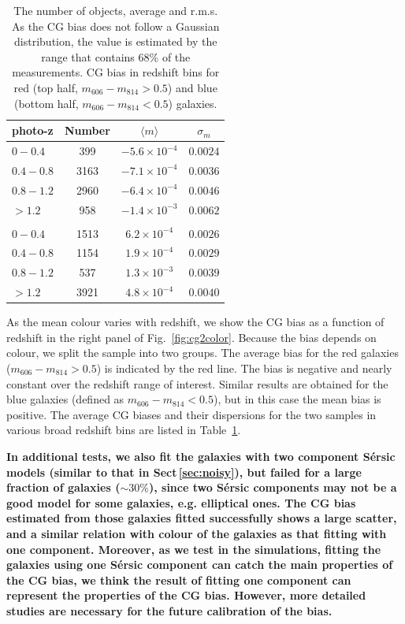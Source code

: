 \documentclass[useAMS,usenatbib]{mnras}
\begin{document}
\begin{table}
\begin{center}
  \begin{tabular}{lccc}
    \hline
    photo-z    &Number &$\langle m\rangle$  &$\sigma_m$ \\
    \hline
    $0-0.4$    &399  &$-5.6\times10^{-4}$  &$0.0024$\\
    $0.4-0.8$  &3163 &$-7.1\times10^{-4}$  &$0.0036$\\
    $0.8-1.2$  &2960 &$-6.4\times10^{-4}$  &$0.0046$\\
    $>1.2$     &958  &$-1.4\times10^{-3}$  &$0.0062$\\
    \\
    $0-0.4$  &1513  &$6.2\times10^{-4}$  &$0.0026$\\
    $0.4-0.8$ &1154  &$1.9\times10^{-4}$  &$0.0029$\\
    $0.8-1.2$ &537  &$1.3\times10^{-3}$  &$0.0039$\\
    $>1.2$  & 3921  &$4.8\times10^{-4}$  &$0.0040$\\
    \hline
  \end{tabular}
  \caption{The number of objects, average and r.m.s. As the CG bias does not follow a Gaussian distribution, the value is estimated by the range that contains $68 \% $ of the measurements. CG bias in redshift bins for red (top half, $m_{606}-m_{814}>0.5$) and blue (bottom half, $m_{606}-m_{814}<0.5$) galaxies. }
  \label{table:calibration}
\end{center}
\end{table}

As the mean colour varies with redshift, we show the CG bias as a function of redshift in the right panel of
Fig.~\ref{fig:cg2color}.  Because the bias depends on colour, we split the sample into two groups. The average bias for the red galaxies ($m_{606}-m_{814}>0.5$) is indicated by the red line. The bias is negative and nearly constant over the redshift range of interest. Similar results are obtained for the blue galaxies
(defined as $m_{606}-m_{814}<0.5$), but in this case the mean bias is positive. The average CG biases and their dispersions for the two samples in various broad redshift bins are listed in Table~\ref{table:calibration}.

{\bf In additional tests, we also fit the galaxies with two component S{\'e}rsic models (similar to that in Sect\,\ref{sec:noisy}), but failed for a large fraction of galaxies ($\sim30\%$), since two S{\'e}rsic components may not be a good model for some galaxies, e.g. elliptical ones. The CG bias estimated from those galaxies fitted successfully shows a large scatter, and a similar relation with colour of the galaxies as that fitting with one component. Moreover, as we test in the simulations, fitting the galaxies using one S{\'e}rsic component can catch the main properties of the CG bias, we think the result of fitting one component can represent the properties of the CG bias. However, more detailed studies are necessary for the future calibration of the bias. }
\end{document}
